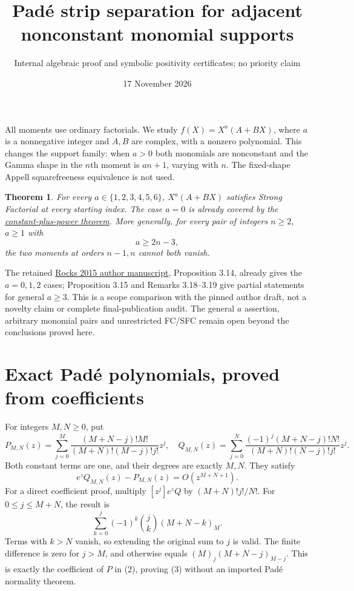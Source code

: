 \documentclass[11pt]{article}
\title{Pad\'e strip separation for adjacent nonconstant monomial supports}
\author{Internal algebraic proof and symbolic positivity certificates; no priority claim}
\date{17 November 2026}
\newtheorem{theorem}{Theorem}
\begin{document}
\maketitle
All moments use ordinary factorials. We study
$f(X)=X^a(A+BX)$, where $a$ is a nonnegative integer and $A,B$ are
complex, with a nonzero polynomial. This changes the support family:
when $a>0$ both monomials are nonconstant and the Gamma shape in the
$n$th moment is $an+1$, varying with $n$. The fixed-shape Appell
squarefreeness equivalence is not used.

\begin{theorem}\label{thm:family}
For every $a\in\{1,2,3,4,5,6\}$, $X^a(A+BX)$ satisfies Strong Factorial
at every starting index. The case $a=0$ is already covered by the
\href{ALL_UNIVARIATE_TWO_TERM_SFC.tex}{constant-plus-power theorem}.
More generally, for every pair of integers $n\ge2$, $a\ge1$ with
\[
                            a\ge2n-3,                 \tag{1}
\]
the two moments at orders $n-1,n$ cannot both vanish.
\end{theorem}
The retained \href{sources/rocks-2015-author-preprint.pdf}{Rocks 2015 author manuscript},
Proposition 3.14, already gives
the $a=0,1,2$ cases; Proposition 3.15 and Remarks 3.18--3.19 give partial
statements for general $a\ge3$. This is a scope comparison with the pinned
author draft, not a novelty claim or complete final-publication audit.
The general $a$ assertion, arbitrary monomial pairs and unrestricted
FC/SFC remain open beyond the conclusions proved here.

\section{Exact Pad\'e polynomials, proved from coefficients}
For integers $M,N\ge0$, put
\[
 P_{M,N}(z)=\sum_{j=0}^M
 \frac{(M+N-j)!M!}{(M+N)!(M-j)!j!}z^j,
\quad
 Q_{M,N}(z)=\sum_{j=0}^N
 \frac{(-1)^j(M+N-j)!N!}{(M+N)!(N-j)!j!}z^j.
                                                               \tag{2}
\]
Both constant terms are one, and their degrees are exactly $M,N$.
They satisfy
\[
                  e^zQ_{M,N}(z)-P_{M,N}(z)=O(z^{M+N+1}). \tag{3}
\]
For a direct coefficient proof, multiply $[z^j]e^zQ$ by
$(M+N)!j!/N!$. For $0\le j\le M+N$, the result is
\[
 \sum_{k=0}^{j}(-1)^k\binom jk(M+N-k)_{\underline M}.
\]
Terms with $k>N$ vanish, so extending the original sum to $j$ is valid.
The finite difference is zero for $j>M$, and otherwise equals
$(M)_{\underline j}(M+N-j)_{\underline{M-j}}$.
This is exactly the coefficient of $P$ in (2), proving (3) without
an imported Pad\'e normality theorem.
\end{document}
